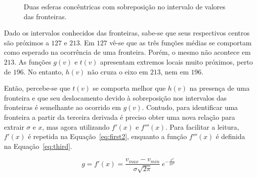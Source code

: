 \begin{figure}[h]
	\centering
	\caption{Duas esferas concêntricas com sobreposição no intervalo de valores das fronteiras.}
	\label{fig:m_double_sphere_disc}
\end{figure}
	
	Dado os intervalos conhecidos das fronteiras, sabe-se que seus respectivos centros são próximos a $ 127 $ e $ 213 $. Em $ 127 $ vê-se que as três funções médias se comportam como esperado na ocorrência de uma fronteira. Porém, o mesmo não acontece em $ 213 $. As funções $ g(v) $ e $ t(v) $ apresentam extremos locais muito próximos, perto de $ 196 $. No entanto, $ h(v) $ não cruza o eixo em $ 213 $, nem em $ 196 $.
	
	Então, percebe-se que $ t(v) $ se comporta melhor que $ h(v) $ na presença de uma fronteira e que seu deslocamento devido à sobreposição nos intervalos das fronteiras é semelhante ao ocorrido em $ g(v) $. Contudo, para identificar uma fronteira a partir da terceira derivada é preciso obter uma nova relação para extrair $ \sigma $ e $ x $, mas agora utilizando $ f'(x) $ e $ f'''(x) $. Para facilitar a leitura, $ f'(x) $ é repetida na Equação~\eqref{eq:first2}, enquanto a função $ f'''(x) $ é definida na Equação~\eqref{eq:third}.
	
\begin{equation} \label{eq:first2}
g = f'(x) = \frac{v_{max} - v_{min}}{\sigma\sqrt{2\pi}}\ e^{-\frac{x^{2}}{2\sigma^{2}}}
\end{equation} \

